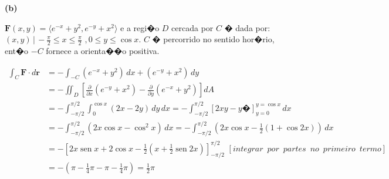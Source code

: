 \documentclass[12pt]{article}
\DeclareMathOperator{\sen}{sen}
\begin{document}
\begin{enumerate}
          \textbf{(b)}

          $\textbf{F}(x,y)= \langle e^{-x} + y^2, e^{-y} + x^2 \rangle $ e a regi�o $D$ cercada por $C$ � dada por: ${ (x,y)\,|\,-\frac{\pi}{2}\leq x \leq \frac{\pi}{2}\,\, , 0 \leq y \leq \cos x }$. $C$ � percorrido no sentido hor�rio, ent�o $-C$ fornece a orienta��o positiva.



          \begin{align*}
              \int_C \textbf{F}\cdot d\textbf{r} & = -\int_{-C} (e^{-x} + y^2)\,dx + (e^{-y} + x^2)\,dy \\& = - \iint_{D} \left[\frac{\partial}{\partial x}(e^{-y} + x^2) - \frac{\partial}{\partial y}(e^{-x} + y^2)\right]dA\\& = -\int_{-\pi/2}^{\pi/2} \int_0^{\cos x}(2x-2y)\,dy\,dx = -\int_{-\pi/2}^{\pi/2} \left[ 2xy - y� \right]_{y=0}^{y=\cos x}\,dx\\&= -\int_{-\pi/2}^{\pi/2}(2x \cos x - \cos^2 x)\,dx = -\int_{-\pi/2}^{\pi/2} \left(2x\cos x - \frac{1}{2}(1+ \cos 2x)\right)\,dx \\& = - \left[ 2x \sen x + 2 \cos x - \frac{1}{2}\left(x + \frac{1}{2} \sen 2x \right) \right]_{-\pi/2}^{\pi/2} \,\, [
                      integrar \,\,\, por\,\,\,partes\,\,\, no\,\,\, primeiro\,\,\, termo]              \\& = - \left(\pi - \frac{1}{4}\pi -\pi - \frac{1}{4}\pi\right)= \frac{1}{2}\pi
          \end{align*}



\end{enumerate}
\end{document}
